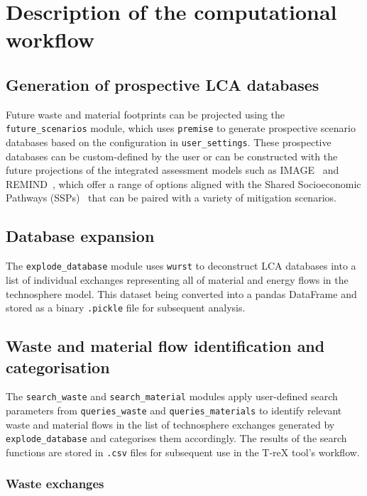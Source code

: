 \documentclass{article}
\renewcommand{\texttt}[1]{{\ttfamily\small\nolinkurl{#1}}}
\begin{document}
\section{Description of the computational workflow}


\subsection{Generation of prospective LCA databases}

Future waste and material footprints can be projected using the \texttt{future\_scenarios} module, which uses \texttt{premise} to generate prospective scenario databases based on the configuration in \texttt{user\_settings}. These prospective databases can be custom-defined by the user or can be constructed with the future projections of the integrated assessment models such as IMAGE~\citep{stehfest2014image} and REMIND~\citep{remind2020model}, which offer a range of options aligned with the Shared Socioeconomic Pathways (SSPs)~\citep{ssp2020ghg} that can be paired with a variety of mitigation scenarios.

\subsection{Database expansion}
The \texttt{explode\_database} module uses \texttt{wurst} to deconstruct LCA databases into a list of individual exchanges representing all of material and energy flows in the technosphere model. This dataset being converted into a pandas DataFrame and stored as a binary \texttt{.pickle} file for subsequent analysis.

\subsection{Waste and material flow identification and categorisation}

The \texttt{search\_waste} and \texttt{search\_material} modules apply user-defined search parameters from \texttt{queries\_waste} and \texttt{queries\_materials} to identify relevant waste and material flows in the list of technosphere exchanges generated by \texttt{explode\_database} and categorises them accordingly. The results of the search functions are stored in \texttt{.csv} files for subsequent use in the T-reX tool's workflow.

\subsubsection{Waste exchanges}\label{sec:method-T-reX-waste_exchanges}
\end{document}
